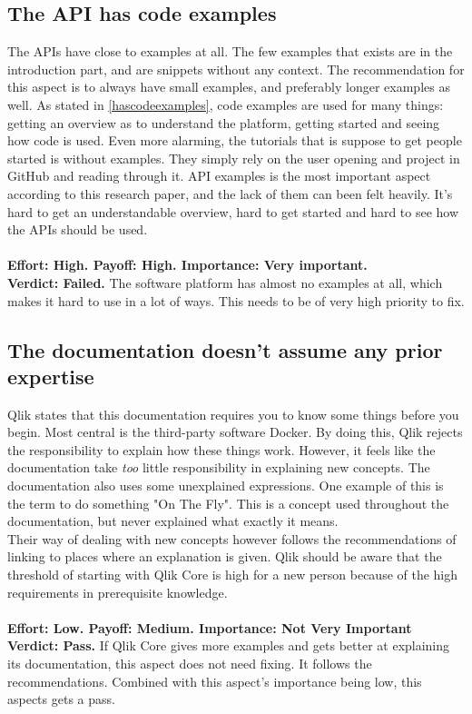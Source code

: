 \documentclass{cslthse-msc}
\begin{document}
    \subsection{The API has code examples}
    The APIs have close to  examples at all. The few examples that exists are in the introduction part, and are snippets without any context. The recommendation for this aspect is to always have small examples, and preferably longer examples as well. As stated in \ref{hascodeexamples}, code examples are used for many things: getting an overview as to understand the platform, getting started and seeing how code is used. Even more alarming, the tutorials that is suppose to get people started is without examples. They simply rely on the user opening and project in GitHub and reading through it. API examples is the most important aspect according to this research paper, and the lack of them can been felt heavily. It's hard to get an understandable overview, hard to get started and hard to see how the APIs should be used.\\ \\
    \textbf{Effort: High. Payoff: High. Importance: Very important.}\\
    \textbf{Verdict: Failed.} The software platform has almost no examples at all, which makes it hard to use in a lot of ways. This needs to be of very high priority to fix.
    \subsection{The documentation doesn’t assume any prior expertise}
    Qlik states that this documentation requires you to know some things before you begin. Most central is the third-party software Docker. By doing this, Qlik rejects the responsibility to explain how these things work. However, it feels like the documentation take \textit{too} little responsibility in explaining new concepts. The documentation also uses some unexplained expressions. One example of this is the term to do something "On The Fly". This is a concept used throughout the documentation, but never explained what exactly it means. \\ Their way of dealing with new concepts however follows the recommendations of linking to places where an explanation is given. Qlik should be aware that the threshold of starting with Qlik Core is high for a new person because of the high requirements in prerequisite knowledge.\\ \\
    \textbf{Effort: Low. Payoff: Medium. Importance: Not Very Important}\\
    \textbf{Verdict: Pass.} If Qlik Core gives more examples and gets better at explaining its documentation, this aspect does not need fixing. It follows the recommendations. Combined with this aspect's importance being low, this aspects gets a pass.
\end{document}
